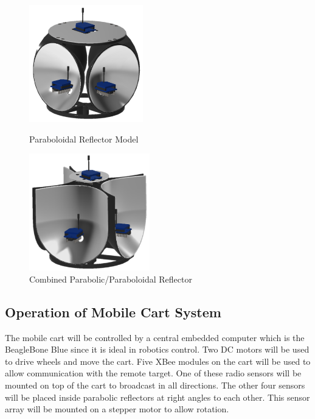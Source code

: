\begin{figure}[h!]
  \centering
  \begin{minipage}[t]{0.5\textwidth}
    \centering
    \includegraphics[height=2in]{figs/img/paraboloidalReflector}
    \captionsetup{width=\textwidth, justification=raggedright}
    \caption{Paraboloidal Reflector Model}
    \label{fig:parabolodialReflector}
  \end{minipage}
  \begin{minipage}[t]{0.4\textwidth}
    \centering
    \includegraphics[height=2in]{figs/img/parabolicReflector}
    \captionsetup{width=\textwidth, justification=raggedright}
    \caption{Combined Parabolic/Paraboloidal Reflector}
    \label{fig:parabolicReflector}
  \end{minipage}
\end{figure}

\subsection{Operation of Mobile Cart System}
The mobile cart will be controlled by a central embedded computer which is the BeagleBone Blue since it is ideal in robotics control. Two DC motors will be used to drive wheels and move the cart. Five XBee modules on the cart will be used to allow communication with the remote target. One of these radio sensors will be mounted on top of the cart to broadcast in all directions. The other four sensors will be placed inside parabolic reflectors at right angles to each other. This sensor array will be mounted on a stepper motor to allow rotation.



